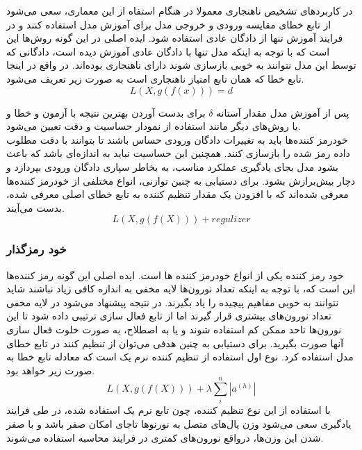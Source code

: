 \documentclass[12pt,a4paper]{report}
\theoremstyle{definition}
\theoremstyle{definition}
\begin{document}
در کاربردهای تشخیص ناهنجاری معمولا در هنگام استفاه از این معماری، سعی می‌شود از تابع خطای مقایسه ورودی و خروجی مدل برای آموزش مدل استفاده کنند و در فرایند آموزش تنها از دادگان عادی استفاده شود. ایده اصلی در این گونه روش‌ها این است که با توجه به اینکه مدل تنها با دادگان عادی آموزش دیده است، دادگانی که توسط این مدل نتوانند به خوبی بازسازی شوند دارای ناهنجاری بوده‌اند. در واقع در اینجا تابع خطا که همان تابع امتیاز ناهنجاری است به صورت زیر تعریف می‌شود.
\begin{equation}
	L(X, g(f(x))) = d
\end{equation}

پس از آموزش مدل مقدار آستانه $\delta$ برای بدست آوردن بهترین نتیجه با آزمون و خطا و یا روش‌های دیگر مانند استفاده از نمودار حساسیت و دقت تعیین می‌شود. \\

خودرمز کننده‌ها باید به تغییرات دادگان ورودی حساس باشند تا بتوانند با دقت مطلوب داده رمز شده را بازسازی کنند. همچنین این حساسیت نباید به اندازه‌ای باشد که باعث بشود مدل بجای یادگیری عملکرد مناسب، به بخاطر سپاری دادگان ورودی بپردازد و دچار بیش‌برازش بشود. برای دستیابی به چنین توازنی، انواع مختلفی از خودرمز کننده‌ها معرفی شده‌اند که با افزودن یک مقدار تنظیم کننده به تابع خطای اصلی معرفی شده، بدست می‌آیند.
\begin{equation}
	L(X, g(f(X))) + regulizer
\end{equation}

\subsubsection{خود رمزگذار }
خود رمز کننده  یکی از انواع خودرمز کننده ها است. ایده اصلی این گونه رمز کننده‌ها این است که، با توجه به اینکه تعداد نورون‌ها لایه مخفی به اندازه کافی زیاد نباشند شاید نتوانند به خوبی مفاهیم پیچیده را یاد بگیرند. در نتیجه پیشنهاد می‌شود در لایه مخفی تعداد نورون‌های بیشتری قرار گیرند اما از تابع فعال سازی ترتیبی داده شود تا این نورون‌ها تاحد ممکن کم استفاده شوند و یا به اصطلاح، به صورت خلوت فعال سازی آنها صورت بگیرید. برای دستیابی به چنین هدفی می‌توان از تنظیم کنند در تابع خطای مدل استفاده کرد. نوع اول استفاده از تنظیم کننده نرم یک است که معادله تابع خطا به صورت زیر خواهد بود.
\begin{equation}
L(X, g(f(X))) + \lambda \sum_{i}^{n}|a^{(h)}|
\end{equation}
با استفاده از این نوع تنظیم کننده، چون تابع نرم یک استفاده شده، در طی فرایند یادگیری سعی می‌شود وزن یال‌های متصل به نورنو‌ها تاجای امکان صفر باشد و با صفر شدن این وزن‌ها، درواقع نورون‌های کمتری در فرایند محاسبه استفاده می‌شوند. 
\end{document}
